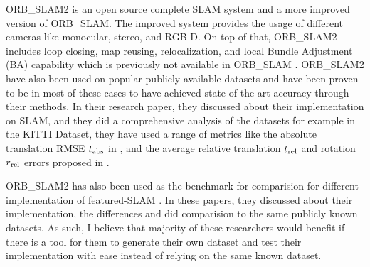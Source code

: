 ORB\_SLAM2 is an open source complete SLAM system and a more improved version of ORB\_SLAM. The improved system provides the usage of different cameras like monocular, stereo, and RGB-D. On top of that, ORB\_SLAM2 includes loop closing, map reusing, relocalization, and local Bundle Adjustment (BA) capability which is previously not available in ORB\_SLAM \cite{journals/corr/Mur-ArtalMT15,mur2017orb}. ORB\_SLAM2 have also been used on popular publicly available datasets and have been proven to be in most of these cases to have achieved state-of-the-art accuracy through their methods. In their research paper, they discussed about their implementation on SLAM, and they did a comprehensive analysis of the datasets for example in the KITTI Dataset, they have used a range of metrics like the absolute translation RMSE $t\textsubscript{abs}$ in \cite{sturm2012benchmark}, and the average relative translation $t\textsubscript{rel}$ and rotation $r\textsubscript{rel}$ errors proposed in \cite{geiger2013vision}.

ORB\_SLAM2 has also been used as the benchmark for comparision for different implementation of featured-SLAM \cite{mur2017visual,paul2017comparative,pire2017s}. In these papers, they discussed about their implementation, the differences and did comparision to the same publicly known datasets. As such, I believe that majority of these researchers would benefit if there is a tool for them to generate their own dataset and test their implementation with ease instead of relying on the same known dataset.